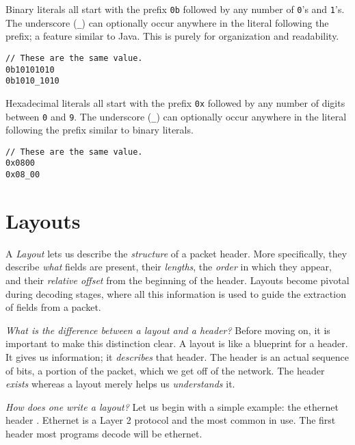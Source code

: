 Binary literals all start with the prefix \texttt{0b} followed by any number of
\texttt{0}'s and \texttt{1}'s. The underscore (\texttt{\_}) can optionally occur
anywhere in the literal following the prefix; a feature similar to Java. This is
purely for organization and readability.

\begin{codepage}
\begin{lstlisting}
// These are the same value.
0b10101010
0b1010_1010
\end{lstlisting}
\end{codepage}

Hexadecimal literals all start with the prefix \texttt{0x} followed by any
number of digits between \texttt{0} and \texttt{9}. The underscore (\texttt{\_})
can optionally occur anywhere in the literal following the prefix similar to
binary literals.

\begin{codepage}
\begin{lstlisting}
// These are the same value.
0x0800
0x08_00
\end{lstlisting}
\end{codepage}

\section{Layouts} \label{tut:layout}

A \textit{Layout} lets us describe the \textit{structure} of a packet header.
More specifically, they describe \textit{what} fields are present, their
\textit{lengths}, the \textit{order} in which they appear, and their
\textit{relative offset} from the beginning of the header. Layouts become
pivotal during decoding stages, where all this information is used to guide the
extraction of fields from a packet.

\textit{What is the difference between a layout and a header?} Before moving on,
it is important to make this distinction clear. A layout is like a blueprint for
a header. It gives us information; it \textit{describes} that header. The header
is an actual sequence of bits, a portion of the packet, which we get off of the
network. The header \textit{exists} whereas a layout merely helps us
\textit{understands} it.

\textit{How does one write a layout?} Let us begin with a simple example: the
ethernet header \cite{eth_std}. Ethernet is a Layer 2 \cite{osi_model} protocol
and the most common in use. The first header most programs decode will be
ethernet.

